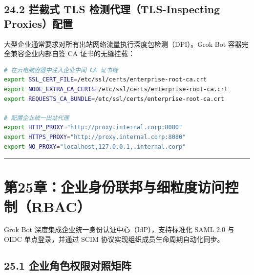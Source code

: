 \documentclass[10.5pt,a4paper,oneside]{report}
\begin{document}
\subsection{24.2 拦截式 TLS 检测代理（TLS-Inspecting
Proxies）配置}\label{ux62e6ux622aux5f0f-tls-ux68c0ux6d4bux4ee3ux7406tls-inspecting-proxiesux914dux7f6e}

大型企业通常要求对所有出站网络流量执行深度包检测（DPI）。Grok Bot
容器完全兼容企业内部自签 CA 证书的无缝挂载：

\begin{lstlisting}[language=bash]
# 在云电脑容器中注入企业中间 CA 证书链
export SSL_CERT_FILE=/etc/ssl/certs/enterprise-root-ca.crt
export NODE_EXTRA_CA_CERTS=/etc/ssl/certs/enterprise-root-ca.crt
export REQUESTS_CA_BUNDLE=/etc/ssl/certs/enterprise-root-ca.crt

# 配置企业统一出站代理
export HTTP_PROXY="http://proxy.internal.corp:8080"
export HTTPS_PROXY="http://proxy.internal.corp:8080"
export NO_PROXY="localhost,127.0.0.1,.internal.corp"
\end{lstlisting}

\begin{center}\rule{0.5\linewidth}{0.5pt}\end{center}

\section{第25章：企业身份联邦与细粒度访问控制（RBAC）}\label{ux7b2c25ux7ae0ux4f01ux4e1aux8eabux4efdux8054ux90a6ux4e0eux7ec6ux7c92ux5ea6ux8bbfux95eeux63a7ux5236rbac}

Grok Bot 深度集成企业统一身份认证中心（IdP），支持标准化 SAML 2.0 与
OIDC 单点登录，并通过 SCIM 协议实现组织成员生命周期自动化同步。

\subsection{25.1
企业角色权限对照矩阵}\label{ux4f01ux4e1aux89d2ux8272ux6743ux9650ux5bf9ux7167ux77e9ux9635}
\end{document}

